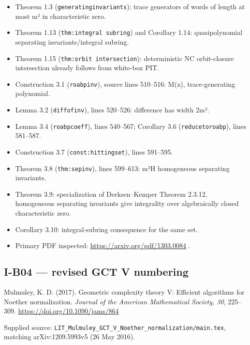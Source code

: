 \documentclass[11pt,a4paper]{article}
\providecommand{\tightlist}{\setlength{\itemsep}{0pt}\setlength{\parskip}{0pt}}
\theoremstyle{definition}\newtheorem{definition}{Definition}
\begin{document}
\begin{itemize}
\tightlist
\item
  Theorem 1.3 (\nolinkurl{generatinginvariants}): trace generators of words
  of length at most m² in characteristic zero.
\item
  Theorem 1.13 (\texttt{thm:integral\ subring}) and Corollary 1.14:
  quasipolynomial separating invariants/integral subring.
\item
  Theorem 1.15 (\texttt{thm:orbit\ intersection}): deterministic NC
  orbit-closure intersection already follows from white-box PIT.
\item
  Construction 3.1 (\nolinkurl{roabpinv}), source lines 510--516: M(x),
  trace-generating polynomial.
\item
  Lemma 3.2 (\nolinkurl{diffofinv}), lines 520--526: difference has width
  2m².
\item
  Lemma 3.4 (\nolinkurl{roabpcoeff}), lines 540--567; Corollary 3.6
  (\nolinkurl{reducetoroabp}), lines 581--587.
\item
  Construction 3.7 (\nolinkurl{const:hittingset}), lines 591--595.
\item
  Theorem 3.8 (\nolinkurl{thm:sepinv}), lines 599--613:
  m²\textbar H\textbar{} homogeneous separating invariants.
\item
  Theorem 3.9: specialization of Derksen--Kemper Theorem 2.3.12,
  homogeneous separating invariants give integrality over algebraically
  closed characteristic zero.
\item
  Corollary 3.10: integral-subring consequence for the same set.
\item
  Primary PDF inspected: \url{https://arxiv.org/pdf/1303.0084} .
\end{itemize}

\subsection{I-B04 --- revised GCT V
numbering}\label{i-b04--revised-gct-v-numbering}

Mulmuley, K. D. (2017). Geometric complexity theory V: Efficient
algorithms for Noether normalization. \emph{Journal of the American
Mathematical Society, 30}, 225--309.
\url{https://doi.org/10.1090/jams/864}

Supplied source:
\nolinkurl{LIT_Mulmuley_GCT_V_Noether_normalization/main.tex},
matching arXiv:1209.5993v5 (26 May 2016).
\end{document}
